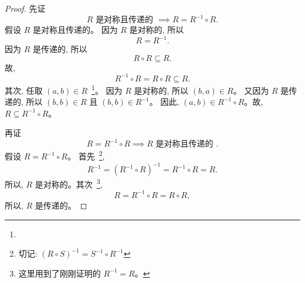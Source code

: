 \documentclass[a4paper, justified]{tufte-handout}
\begin{document}
\begin{proof}
  先证
  \[
    R \text{ 是对称且传递的 } \implies R = R^{-1} \circ R.
  \]
  假设 $R$ 是对称且传递的。
  因为 $R$ 是对称的, 所以
  \[
    R = R^{-1}.
  \]
  因为 $R$ 是传递的, 所以
  \[
    R \circ R \subseteq R.
  \]
  故,
  \[
    R^{-1} \circ R = R \circ R \subseteq R.
  \]
  其次, 任取 $(a, b) \in R$~\footnote{\vspace{1em}}。
  因为 $R$ 是对称的, 所以 $(b, a) \in R$。
  又因为 $R$ 是传递的, 所以 $(b, b) \in R$ 且 $(b, b) \in R^{-1}$。
  因此, $(a, b) \in R^{-1} \circ R$。故, $R \subseteq R^{-1} \circ R$。

  再证
  \[
     R = R^{-1} \circ R \implies R \text{ 是对称且传递的 }.
  \]
  假设 $R = R^{-1} \circ R$。
  首先~\footnote{切记: $(R \circ S)^{-1} = S^{-1} \circ R^{-1}$},
  \[
    R^{-1} = (R^{-1} \circ R)^{-1} = R^{-1} \circ R = R.
  \]
  所以, $R$ 是对称的。其次~\footnote{这里用到了刚刚证明的 $R^{-1} = R$。},
  \[
    R = R^{-1} \circ R = R \circ R,
  \]
  所以, $R$ 是传递的。



\end{proof}
\end{document}
